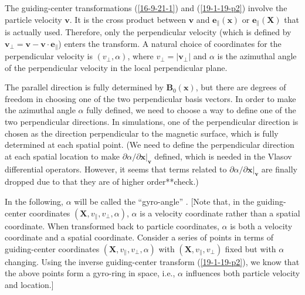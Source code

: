 \documentclass{article}
\newcommand{\nobracket}{}
\newcommand{\tmmathbf}[1]{\ensuremath{\boldsymbol{#1}}}
\newcommand{\tmtexttt}[1]{\text{{\ttfamily{#1}}}}
\begin{document}
The guiding-center transformations (\ref{16-9-21-1}) and (\ref{19-1-19-p2})
involve the particle velocity $\mathbf{v}$. It is the cross product between
$\mathbf{v}$ and $\tmmathbf{e}_{\parallel} (\mathbf{x})$ or
$\tmmathbf{e}_{\parallel} (\mathbf{X})$ that is actually used. Therefore, only
the perpendicular velocity (which is defined by $\mathbf{v}_{\perp}
=\mathbf{v}-\mathbf{v} \cdot \mathbf{e}_{\parallel}$) enters the transform. A
natural choice of coordinates for the perpendicular velocity is $(v_{\perp},
\alpha)$, where $v_{\perp} = | \mathbf{v}_{\perp} |$ and $\alpha$ is the
azimuthal angle of the perpendicular velocity in the local perpendicular
plane.

The parallel direction is fully determined by $\mathbf{B}_0 (\mathbf{x})$, but
there are degrees of freedom in choosing one of the two perpendicular basis
vectors. In order to make the azimuthal angle $\alpha$ fully defined, we need
to choose a way to define one of the two perpendicular directions. In
\tmtexttt{GEM} simulations, one of the perpendicular direction is chosen as
the direction perpendicular to the magnetic surface, which is fully determined
at each spatial point. (We need to define the perpendicular direction at each
spatial location to make $\partial \alpha / \partial \mathbf{x} |_{\mathbf{v}}
\nobracket$ defined, which is needed in the Vlasov differential operators.
However, it seems that terms related to $\partial \alpha / \partial \mathbf{x}
|_{\mathbf{v}} \nobracket$ are finally dropped due to that they are of higher
order**check.)

In the following, $\alpha$ will be called the ``gyro-angle'' . [Note that, in
the guiding-center coordinates $(\mathbf{X}, v_{\parallel}, v_{\perp},
\alpha)$, $\alpha$ is a velocity coordinate rather than a spatial coordinate.
When transformed back to particle coordinates, $\alpha$ is both a velocity
coordinate and a spatial coordinate. Consider a series of points in terms of
guiding-center coordinates $(\mathbf{X}, v_{\parallel}, v_{\perp}, \alpha)$
with $(\mathbf{X}, v_{\parallel}, v_{\perp})$ fixed but with $\alpha$
changing. Using the inverse guiding-center transform (\ref{19-1-19-p2}), we
know that the above points form a gyro-ring in space, i.e., $\alpha$
influences both particle velocity and location.]
\end{document}
